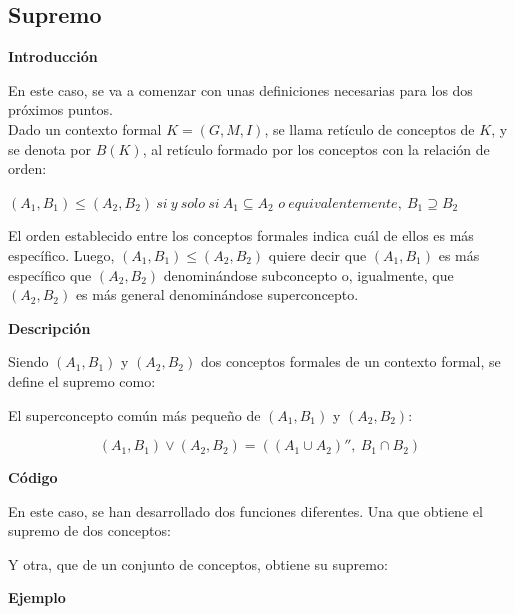     \subsection{Supremo}


        \textbf{Introducci\'on}
    
        En este caso, se va a comenzar con unas definiciones necesarias para los dos pr\'oximos puntos.
        \\

        Dado un contexto formal \( K = (G, M, I) \), se llama ret\'iculo de conceptos de \(K\), y se denota por \( B (K) \), al ret\'iculo 
        formado por los conceptos con la relaci\'on de orden:

        \( (A_{1}, B_{1}) \leq (A_{2}, B_{2}) ~ si ~ y ~ solo ~ si ~ A_{1} \subseteq A_{2} \)
        \( o ~ equivalentemente, ~ B_{1} \supseteq B_{2} \)

        \bigskip


        El orden establecido entre los conceptos formales indica cu\'al de ellos es m\'as espec\'ifico. Luego,  \( (A_{1}, B_{1}) \leq (A_{2}, B_{2})\) 
        quiere decir que  \( (A_{1}, B_{1}) \) es m\'as espec\'ifico que \( (A_{2}, B_{2}) \) denomin\'andose subconcepto o, igualmente, que  
        \( (A_{2}, B_{2}) \) es m\'as general denomin\'andose superconcepto.

        \bigskip


        \textbf{Descripci\'on}

        Siendo \((A_{1}, B_{1}) \) y \((A_{2}, B_{2})\) dos conceptos formales de un contexto formal, se define el supremo como:

        El superconcepto com\'un m\'as peque\~no de \((A_{1}, B_{1}) \) y \((A_{2}, B_{2})\):

        \[ (A_{1}, B_{1}) \vee (A_{2}, B_{2}) = ((A_{1} \cup A_{2})'', ~ B_{1}\cap B_{2}) \]

        \bigskip
        \textbf{C\'odigo}

        En este caso, se han desarrollado dos funciones diferentes. Una que obtiene el supremo de dos conceptos:

        

        Y otra, que de un conjunto de conceptos, obtiene su supremo:

        

        \clearpage

        \textbf{Ejemplo}

